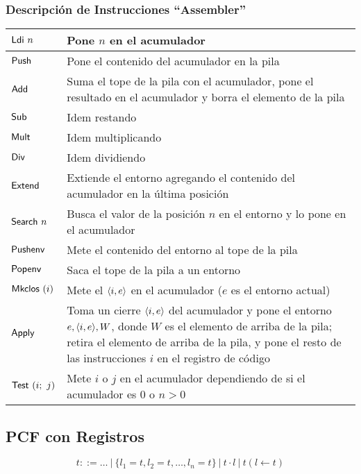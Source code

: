 \documentclass[twoside,a4paper,12pt]{article}
\theoremstyle{definition}
\theoremstyle{remark}
\begin{document}
\subsubsection*{Descripción de Instrucciones ``Assembler''}
\begin{tabular}{lp{12.6cm}}\\
  \hline $\mathsf{Ldi}~n$    & Pone $n$ en el acumulador \\
  \hline $\mathsf{Push}$     & Pone el contenido del acumulador en la pila \\
  \hline $\mathsf{Add}$      & Suma el tope de la pila con el acumulador, pone el resultado en el acumulador y borra el elemento de la pila \\
  \hline $\mathsf{Sub}$      & Idem restando \\
  \hline $\mathsf{Mult}$     & Idem multiplicando \\
  \hline $\mathsf{Div}$      & Idem dividiendo \\
  \hline $\mathsf{Extend}$   & Extiende el entorno agregando el contenido del acumulador en la última posición \\
  \hline $\mathsf{Search}~n$ & Busca el valor de la posición $n$ en el entorno y lo pone en el acumulador \\
  \hline $\mathsf{Pushenv}$  & Mete el contenido del entorno al tope de la pila \\
  \hline $\mathsf{Popenv}$   & Saca el tope de la pila a un entorno \\
  \hline $\mathsf{Mkclos}~(i)$ & Mete el $\langle{i},{e}\rangle$ en el acumulador ($e$ es el entorno actual) \\
  \hline $\mathsf{Apply}$    & Toma un cierre $\langle{i},{e}\rangle$ del acumulador
  y pone el entorno $e, \langle{i},{e}\rangle, W$, donde $W$ es el elemento de
  arriba de la pila; retira el elemento de arriba de la pila, y pone el
  resto de las instrucciones $i$ en el registro de código \\
  \hline $\mathsf{Test}~(i;~j)$  & Mete $i$ o $j$ en el acumulador dependiendo de si el acumulador es $0$ o $n>0$ \\ 
  \hline
\end{tabular}
\newpage

\subsection*{PCF con Registros}

\begin{equation*}
  t ::= \dots~|~\{l_1=t,l_2=t,\dots,l_n=t\}~|~t\cdot l~|~t(l\leftarrow t)
\end{equation*}
\end{document}
